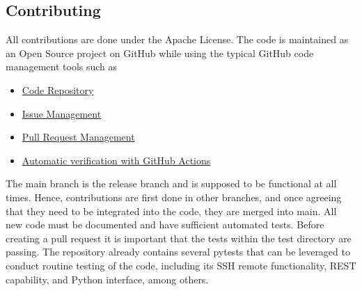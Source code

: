 % 


\subsection{Contributing}\label{contributing}

All contributions are done under the Apache License.  The code is
maintained as an Open Source project on GitHub while using the typical
GitHub code management tools such as

\begin{itemize}
\item
  \href{https://github.com/cloudmesh/cloudmesh-cc}{Code Repository}
\item
  \href{https://github.com/cloudmesh/cloudmesh-cc/issues}{Issue Management}
\item
  \href{https://github.com/cloudmesh/cloudmesh-cc/pulls}{Pull Request Management}
\item
  \href{https://github.com/cloudmesh/cloudmesh-cc/actions}{Automatic verification with GitHub Actions}
\end{itemize}

The main branch is the release branch and is supposed to be functional
at all times. Hence, contributions are first done in other branches,
and once agreeing that they need to be integrated into the code, they
are merged into main. All new code must be documented and have
sufficient automated tests.  Before creating a pull request it is
important that the tests within the test directory are passing.  The
repository already contains several pytests that can be leveraged to
conduct routine testing of the code, including its SSH remote
functionality, REST capability, and Python interface, among others.
